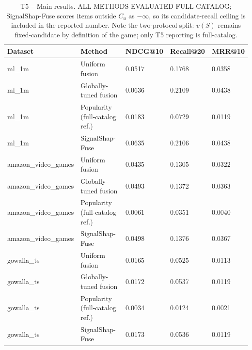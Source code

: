 \begin{table}[htbp]
\centering
\footnotesize
\caption{T5 -- Main results. ALL METHODS EVALUATED FULL-CATALOG; SignalShap-Fuse scores items outside $C_u$ as $-\infty$, so its candidate-recall ceiling is included in the reported number. Note the two-protocol split: $v(S)$ remains fixed-candidate by definition of the game; only T5 reporting is full-catalog.}
\label{tab:T5_main_results}
\begin{tabular}{lllll}
\toprule
Dataset & Method & NDCG@10 & Recall@20 & MRR@10 \\
\midrule
ml\_1m & Uniform fusion & 0.0517 & 0.1768 & 0.0358 \\
ml\_1m & Globally-tuned fusion & 0.0636 & 0.2109 & 0.0438 \\
ml\_1m & Popularity (full-catalog ref.) & 0.0183 & 0.0729 & 0.0119 \\
ml\_1m & SignalShap-Fuse & 0.0635 & 0.2106 & 0.0438 \\
amazon\_video\_games & Uniform fusion & 0.0435 & 0.1305 & 0.0322 \\
amazon\_video\_games & Globally-tuned fusion & 0.0493 & 0.1372 & 0.0363 \\
amazon\_video\_games & Popularity (full-catalog ref.) & 0.0061 & 0.0351 & 0.0040 \\
amazon\_video\_games & SignalShap-Fuse & 0.0498 & 0.1376 & 0.0367 \\
gowalla\_ts & Uniform fusion & 0.0165 & 0.0525 & 0.0113 \\
gowalla\_ts & Globally-tuned fusion & 0.0172 & 0.0537 & 0.0119 \\
gowalla\_ts & Popularity (full-catalog ref.) & 0.0034 & 0.0124 & 0.0021 \\
gowalla\_ts & SignalShap-Fuse & 0.0173 & 0.0536 & 0.0119 \\
\bottomrule
\end{tabular}
\end{table}
